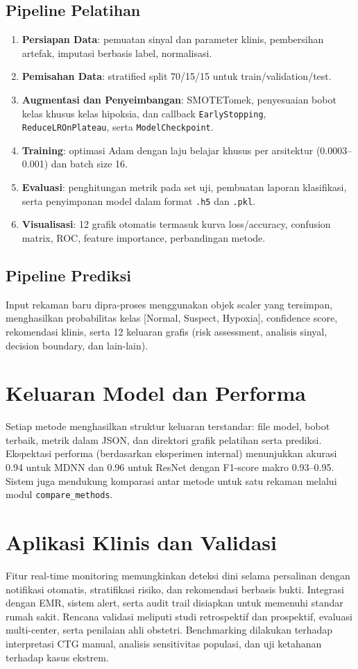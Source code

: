 \documentclass[11pt,a4paper]{article}
\begin{document}
\subsection{Pipeline Pelatihan}
\begin{enumerate}[leftmargin=*]
    \item \textbf{Persiapan Data}: pemuatan sinyal dan parameter klinis, pembersihan artefak, imputasi berbasis label, normalisasi.
    \item \textbf{Pemisahan Data}: stratified split 70/15/15 untuk train/validation/test.
    \item \textbf{Augmentasi dan Penyeimbangan}: SMOTETomek, penyesuaian bobot kelas khusus kelas hipoksia, dan callback \texttt{EarlyStopping}, \texttt{ReduceLROnPlateau}, serta \texttt{ModelCheckpoint}.
    \item \textbf{Training}: optimasi Adam dengan laju belajar khusus per arsitektur (0.0003--0.001) dan batch size 16.
    \item \textbf{Evaluasi}: penghitungan metrik pada set uji, pembuatan laporan klasifikasi, serta penyimpanan model dalam format \texttt{.h5} dan \texttt{.pkl}.
    \item \textbf{Visualisasi}: 12 grafik otomatis termasuk kurva loss/accuracy, confusion matrix, ROC, feature importance, perbandingan metode.
\end{enumerate}
\subsection{Pipeline Prediksi}
Input rekaman baru dipra-proses menggunakan objek scaler yang tersimpan, menghasilkan probabilitas kelas [Normal, Suspect, Hypoxia], confidence score, rekomendasi klinis, serta 12 keluaran grafis (risk assessment, analisis sinyal, decision boundary, dan lain-lain).

\section{Keluaran Model dan Performa}
Setiap metode menghasilkan struktur keluaran terstandar: file model, bobot terbaik, metrik dalam JSON, dan direktori grafik pelatihan serta prediksi. Ekspektasi performa (berdasarkan eksperimen internal) menunjukkan akurasi 0.94 untuk MDNN dan 0.96 untuk ResNet dengan F1-score makro 0.93--0.95. Sistem juga mendukung komparasi antar metode untuk satu rekaman melalui modul \texttt{compare\_methods}.

\section{Aplikasi Klinis dan Validasi}
Fitur real-time monitoring memungkinkan deteksi dini selama persalinan dengan notifikasi otomatis, stratifikasi risiko, dan rekomendasi berbasis bukti. Integrasi dengan EMR, sistem alert, serta audit trail disiapkan untuk memenuhi standar rumah sakit. Rencana validasi meliputi studi retrospektif dan prospektif, evaluasi multi-center, serta penilaian ahli obstetri. Benchmarking dilakukan terhadap interpretasi CTG manual, analisis sensitivitas populasi, dan uji ketahanan terhadap kasus ekstrem.
\end{document}
